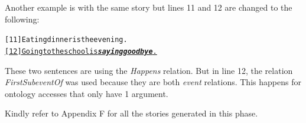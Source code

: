 Another example is with the same story but lines 11 and 12 are changed to the following:

\begin{alltt}
[11] Eating dinner is the evening.
\underline{[12] Going to the school is \emph{\textbf{saying goodbye}}.}
\end{alltt}

These two sentences are using the \textit{Happens} relation. But in line 12, the relation \textit{FirstSubeventOf} was used because they are both \textit{event} relations. This happens for ontology accesses that only have 1 argument.

Kindly refer to Appendix F for all the stories generated in this phase.









